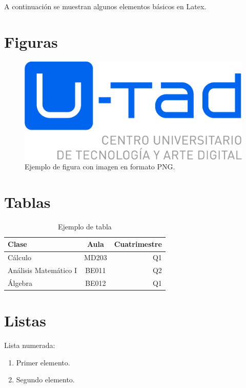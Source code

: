A continuación se muestran algunos elementos básicos en Latex.

\section*{Figuras}

\vspace{0.3cm}
\begin{figure}[!h]
	\centering
	\includegraphics[scale=0.5]{./Figuras/LogoUtad.png}
	\caption{Ejemplo de figura con imagen en formato PNG.}
	\label{fig:01}
\end{figure}


\section*{Tablas}

\begin{table}[!htbp]
	\begin{center}
		\begin{tabular}{| l | c | r |}
			\hline
			Clase & Aula & Cuatrimestre \\ 
			\hline
			\hline
			Cálculo & MD203 & Q1 \\
			\hline
			Análisis Matemático I & BE011 & Q2 \\
			\hline
			Álgebra & BE012 & Q1 \\ 
			\hline
		\end{tabular}
		\caption{Ejemplo de tabla}
		\label{tab:fruta}
	\end{center}
\end{table} 

\section*{Listas}

Lista numerada:
\begin{enumerate}
\item Primer elemento.
\item Segundo elemento.
\end{enumerate}

